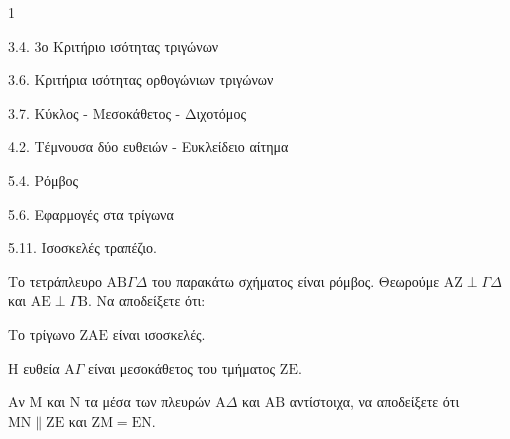 \begin{ylh}{1}
    \item 3.4. 3ο Κριτήριο ισότητας τριγώνων
    \item 3.6. Κριτήρια ισότητας ορθογώνιων τριγώνων
    \item 3.7. Κύκλος - Μεσοκάθετος - Διχοτόμος
    \item 4.2. Τέμνουσα δύο ευθειών - Ευκλείδειο αίτημα
    \item 5.4. Ρόμβος
    \item 5.6. Εφαρμογές στα τρίγωνα
    \item 5.11. Ισοσκελές τραπέζιο.
\end{ylh}
Το τετράπλευρο $\mathrm{A}\mathrm{B}\Gamma\Delta$ του παρακάτω σχήματος είναι ρόμβος. Θεωρούμε $\mathrm{A}\mathrm{Z} \perp \Gamma\Delta$ και $\mathrm{A}\mathrm{E} \perp \Gamma\mathrm{B}$.
Να αποδείξετε ότι:
\begin{alist}
    \item Το τρίγωνο $\mathrm{Z}\mathrm{A}\mathrm{E}$ είναι ισοσκελές. 
    \item Η ευθεία $\mathrm{A}\Gamma$ είναι μεσοκάθετος του τμήματος $\mathrm{Z}\mathrm{E}$. 
    \item Αν $\mathrm{M}$ και $\mathrm{N}$ τα μέσα των πλευρών $\mathrm{A}\Delta$ και $\mathrm{A}\mathrm{B}$ αντίστοιχα, να αποδείξετε ότι $\mathrm{M}\mathrm{N} \parallel \mathrm{Z}\mathrm{E}$ και $\mathrm{Z}\mathrm{M} = \mathrm{E}\mathrm{N}$. 
\end{alist}
